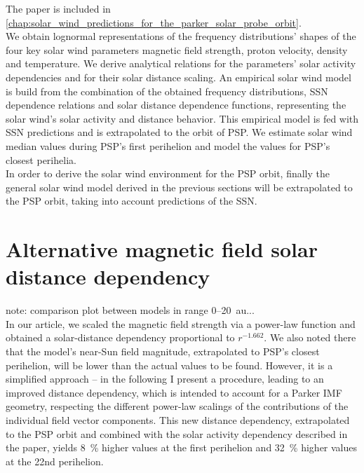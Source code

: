 The paper \citet{Venzmer2018} is included in \autoref{chap:solar_wind_predictions_for_the_parker_solar_probe_orbit}.\\

We obtain lognormal representations of the frequency distributions’ shapes of the four key solar wind parameters magnetic field strength, proton velocity, density and temperature. We derive analytical relations for the parameters’ solar activity dependencies and for their solar distance scaling. An empirical solar wind model is build from the combination of the obtained frequency distributions, SSN dependence relations and solar distance dependence functions, representing the solar wind’s solar activity and distance behavior. This empirical model is fed with SSN predictions and is extrapolated to the orbit of PSP. We estimate solar wind median values during PSP’s first perihelion and model the values for PSP’s closest perihelia.\\

In order to derive the solar wind environment for the PSP orbit, finally the general solar wind model derived in the previous sections will be extrapolated to the PSP orbit, taking into account predictions of the SSN.\\


\section{Alternative magnetic field solar distance dependency}

note: comparison plot between models in range 0--20~au...\\

In our article, we scaled the magnetic field strength via a power-law function and obtained a solar-distance dependency proportional to $r^{-1.662}$. We also noted there that the model's near-Sun field magnitude, extrapolated to PSP's closest perihelion, will be lower than the actual values to be found. However, it is a simplified approach -- in the following I present a procedure, leading to an improved distance dependency, which is intended to account for a Parker IMF geometry,  respecting the different power-law scalings of the contributions of the individual field vector components. This new distance dependency, extrapolated to the PSP orbit and combined with the solar activity dependency described in the paper, yields \SI{8}{\%} higher values at the first perihelion and \SI{32}{\%} higher values at the 22nd perihelion.\\

